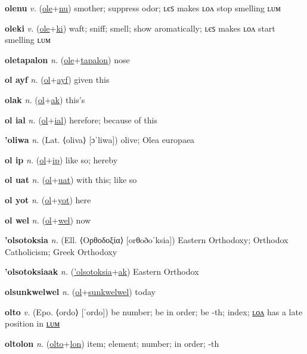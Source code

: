 \textbf{\hypertarget{olenu}{olenu}} \textit{v.} (\hyperlink{ole}{ole}+\allowbreak \hyperlink{nu}{nu})
smother; suppress odor; ʟєꜱ makes ʟᴏᴧ stop smelling ʟᴜᴍ

\textbf{\hypertarget{oleki}{oleki}} \textit{v.} (\hyperlink{ole}{ole}+\allowbreak \hyperlink{ki}{ki})
waft; sniff; smell; show aromatically; ʟєꜱ makes ʟᴏᴧ start smelling ʟᴜᴍ

\textbf{\hypertarget{oletapalon}{oletapalon}} \textit{n.} (\hyperlink{ole}{ole}+\allowbreak \hyperlink{tapalon}{tapalon})
nose

\textbf{\hypertarget{ol ayf}{ol ayf}} \textit{n.} (\hyperlink{ol}{ol}+\allowbreak \hyperlink{ayf}{ayf})
given this

\textbf{\hypertarget{olak}{olak}} \textit{n.} (\hyperlink{ol}{ol}+\allowbreak \hyperlink{ak}{ak})
this’s

\textbf{\hypertarget{ol ial}{ol ial}} \textit{n.} (\hyperlink{ol}{ol}+\allowbreak \hyperlink{ial}{ial})
herefore; because of this

\textbf{\hypertarget{'oliwa}{'oliwa}} \textit{n.} (Lat. ⟨oliva⟩ [ɔˈliwa])
olive; Olea europaea

\textbf{\hypertarget{ol ip}{ol ip}} \textit{n.} (\hyperlink{ol}{ol}+\allowbreak \hyperlink{ip}{ip})
like so; hereby

\textbf{\hypertarget{ol uat}{ol uat}} \textit{n.} (\hyperlink{ol}{ol}+\allowbreak \hyperlink{uat}{uat})
with this; like so

\textbf{\hypertarget{ol yot}{ol yot}} \textit{n.} (\hyperlink{ol}{ol}+\allowbreak \hyperlink{yot}{yot})
here

\textbf{\hypertarget{ol wel}{ol wel}} \textit{n.} (\hyperlink{ol}{ol}+\allowbreak \hyperlink{wel}{wel})
now

\textbf{\hypertarget{'olsotoksia}{'olsotoksia}} \textit{n.} (Ell. ⟨Ορθοδοξία⟩ [orθoðoˈksia])
Eastern Orthodoxy; Orthodox Catholicism; Greek Orthodoxy

\textbf{\hypertarget{'olsotoksiaak}{'olsotoksiaak}} \textit{n.} (\hyperlink{'olsotoksia}{'olsotoksia}+\allowbreak \hyperlink{ak}{ak})
Eastern Orthodox

\textbf{\hypertarget{olsunkwelwel}{olsunkwelwel}} \textit{n.} (\hyperlink{ol}{ol}+\allowbreak \hyperlink{sunkwelwel}{sunkwelwel})
today

\textbf{\hypertarget{olto}{olto}} \textit{v.} (Epo. ⟨ordo⟩ [ˈordo])
be number; be in order; be -th; index; \hyperlink{oltolon}{ʟᴏᴧ} has a late position in \hyperlink{oltolum}{ʟᴜᴍ}

\textbf{\hypertarget{oltolon}{oltolon}} \textit{n.} (\hyperlink{olto}{olto}+\allowbreak \hyperlink{lon}{lon})
item; element; number; in order; -th

